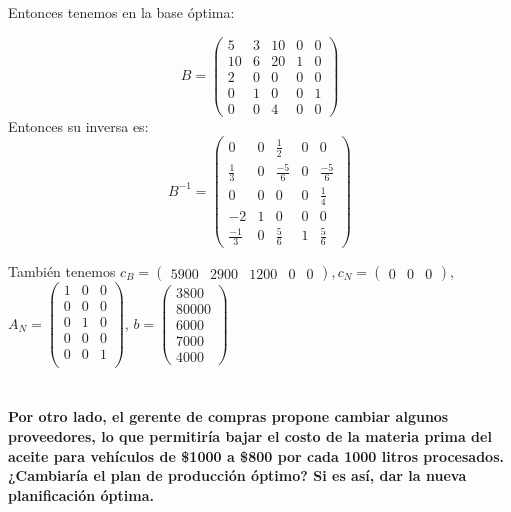 \documentclass[10pt,a4paper]{article}
\begin{document}
Entonces tenemos en la base óptima: 

\[B = \begin{pmatrix}
	5  & 3 & 10 & 0 & 0 \\
	10 & 6 & 20 & 1 & 0 \\
	2  & 0 & 0  & 0 & 0 \\
	0  & 1 & 0  & 0 & 1 \\
	0  & 0 & 4  & 0 & 0
\end{pmatrix}\]
Entonces su inversa es:
\[B^{-1} = \begin{pmatrix}
	0  & 0 &\frac{1}{2} & 0 & 0 \\
	\frac{1}{3} & 0 & \frac{-5}{6} & 0 & \frac{-5}{6} \\
	0  & 0 & 0  & 0 & \frac{1}{4} \\
	-2 & 1 & 0  & 0 & 0 \\
	\frac{-1}{3}  & 0 & \frac{5}{6}  & 1 & \frac{5}{6}
\end{pmatrix}\]

También tenemos $c_B = \begin{pmatrix} 5900 & 2900 & 1200 & 0 & 0 \end{pmatrix}, c_N = \begin{pmatrix} 0 & 0 & 0 \end{pmatrix}$, $A_N = \begin{pmatrix}
	1 & 0 & 0 \\
	0 & 0 & 0 \\
	0 & 1 & 0 \\
	0 & 0 & 0 \\
	0 & 0 & 1 \\
\end{pmatrix}$, $b = \begin{pmatrix} 
3800 \\
80000 \\
6000 \\
7000 \\
4000 
\end{pmatrix}$

\section{} %
\section{} %
\section{} %
\section{} %
\textbf{Por otro lado, el gerente de compras propone cambiar algunos proveedores, lo que permitiría bajar el costo de la materia prima del aceite para vehículos de \$1000 a \$800 por cada 1000 litros procesados. ¿Cambiaría el plan de producción óptimo? Si es así, dar la nueva planificación óptima.}


\section{} %
\section{} %
\section{} %
\end{document}
